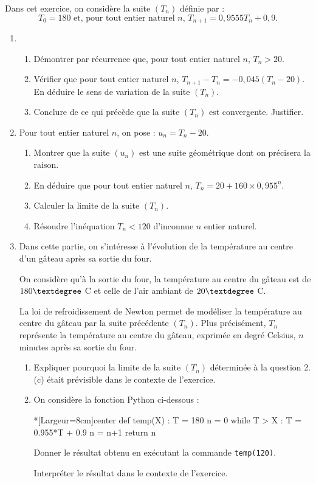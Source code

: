 Dans cet exercice, on considère la suite $\left(T_n\right)$ définie par : \[T_0 = 180 \text{ et, pour tout entier naturel }n \text{, }T_{n+1} = 0,9555T_n + 0,9.\]%
%
\begin{enumerate}
	\item 
	\begin{enumerate}
		\item Démontrer par récurrence que, pour tout entier naturel $n$, $T_n > 20$.
		\item Vérifier que pour tout entier naturel $n$, $T_{n+1} -  T_n  = - 0,045\left(T_n - 20\right)$. En déduire le sens de variation de la suite $\left(T_n\right)$.
		\item Conclure de ce qui précède que la suite $\left(T_n\right)$ est convergente. Justifier.
	\end{enumerate}
	\item Pour tout entier naturel $n$, on pose : $u_n =  T_n - 20$.
	\begin{enumerate}
		\item Montrer que la suite $\left(u_n\right)$ est une suite géométrique dont on précisera la raison.
		\item En déduire que pour tout entier naturel $n$, $T_n =  20 + 160 \times  0,955^n$.
		\item Calculer la limite de la suite $\left(T_n\right)$.
		\item Résoudre l'inéquation $T_n < 120$ d'inconnue $n$ entier naturel.
	\end{enumerate}	
	\item Dans cette partie, on s'intéresse à l'évolution de la température au centre d'un gâteau après sa sortie du four. 
	
	On considère qu'à la sortie du four, la température au centre du gâteau est de $180\textdegree$ C et celle de l'air ambiant de $20\textdegree$ C.
	
	La loi de refroidissement de Newton permet de modéliser la température au centre du gâteau par la suite précédente $\left(T_n\right)$. Plus précisément, $T_n$ représente la température au centre du gâteau, exprimée en degré Celsius, $n$ minutes après sa sortie du four.
	\begin{enumerate}
		\item Expliquer pourquoi la limite de la suite $\left(T_n\right)$ déterminée à la question 2.(c) était prévisible dans le contexte de l'exercice.
		\item On considère la fonction \textsf{Python} ci-dessous :

\begin{CodePythonLstAlt}*[Largeur=8cm]{center}
def temp(X) :
	T = 180
	n = 0
	while T > X :
		T = 0.955*T + 0.9
		n = n+1
	return n
\end{CodePythonLstAlt}
		Donner le résultat obtenu en exécutant la commande \texttt{temp(120)}.
		
		Interpréter le résultat dans le contexte de l'exercice.
	\end{enumerate}
\end{enumerate}

